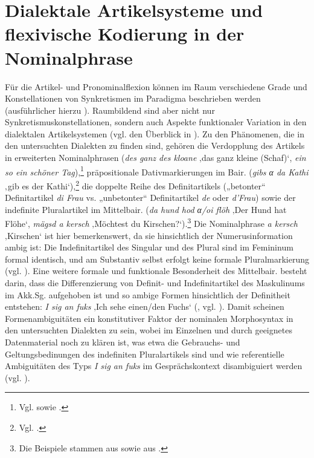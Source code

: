 \section{Dialektale Artikelsysteme und flexivische Kodierung in der Nominalphrase}
\label{sec:9.1}
Für die Artikel- und Pronominalflexion können im Raum verschiedene Grade und Konstellationen von Synkretismen im Paradigma beschrieben werden (ausführlicher hierzu \citealt{Shrier1965}). Raumbildend sind aber nicht nur Synkretismuskonstellationen, sondern auch Aspekte funktionaler Variation in den dialektalen Artikelsystemen (vgl. den Überblick in \citealt[169]{Glaser2017}). Zu den Phänomenen, die in den untersuchten Dialekten zu finden sind, gehören die Verdopplung des Artikels in erweiterten Nominalphrasen (\textit{des ganz des kloane} ‚das ganz kleine (Schaf)‘, \textit{ein so ein schöner Tag}),\footnote{Vgl. \citealt[Karten 1B, 2B, 3B]{SNiB1} sowie \citet{StrobelWeiß2017}.} präpositionale Dativmarkierungen im Bair. (\textit{gibs α da Kathi} ‚gib es der Kathi‘),\footnote{Vgl. \citealt[Karte 5N]{SNiB1}.} die doppelte Reihe des Definitartikels („betonter“ Definitartikel \textit{di Frau} vs. „unbetonter“ Definitartikel \textit{de} oder \textit{d’Frau}) sowie der indefinite Pluralartikel im Mittelbair. (\textit{da hund hod α/oi flöh} ‚Der Hund hat Flöhe‘, \textit{mägsd a kersch} ‚Möchtest du Kirschen?‘).\footnote{Die Beispiele stammen aus \citet{Glaser1996} sowie aus \citealt[Karte 2C, vgl. Karten 3C und 5C]{SNiB1}.} Die Nominalphrase \textit{a kersch} ‚Kirschen‘ ist hier bemerkenswert, da sie hinsichtlich der Numerusinformation ambig ist: Die Indefinitartikel des Singular und des Plural sind im Femininum formal identisch, und am Substantiv selbst erfolgt keine formale Pluralmarkierung (vgl. \citealt[160]{Glaser1996}). Eine weitere formale und funktionale Besonderheit des Mittelbair. besteht darin, dass die Differenzierung von Definit- und Indefinitartikel des Maskulinums im Akk.Sg. aufgehoben ist und so ambige Formen hinsichtlich der Definitheit entstehen: \textit{I sig an fuks} ‚Ich sehe einen/den Fuchs‘ (\citealt[150]{Glaser1996}, vgl. \citealt[323]{Eroms1989}). Damit scheinen Formenambiguitäten ein konstitutiver Faktor der nominalen Morphosyntax in den untersuchten Dialekten zu sein, wobei im Einzelnen und durch geeignetes Datenmaterial noch zu klären ist, was etwa die Gebrauchs- und Geltungsbedinungen des indefiniten Pluralartikels sind und wie referentielle Ambiguitäten des Typs \textit{I sig an fuks} im Gesprächskontext disambiguiert werden (vgl. \citealt[160]{Glaser1996}).


